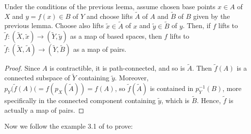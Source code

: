 \documentclass[TFM.tex]{subfiles}
\begin{document}
\begin{lemma}\label{lift}
Under the conditions of the previous leema, assume chosen base points $x\in A$ of $X$ and $y=f(x)\in B$ of $Y$ and choose lifts $\widetilde{A}$ of $A$ and $\widetilde{B}$ of $B$ given by the previous lemma. Choose also lifts $\widetilde{x}\in\widetilde{A}$ of $x$ and $\widetilde{y}\in\widetilde{B}$ of $y$. Then, if $f$ lifts to $\widetilde{f}:(\widetilde{X},\widetilde{x})\to (\widetilde{Y},\widetilde{y})$ as a map of based spaces, then $f$ lifts to $\widetilde{f}:(\widetilde{X},\widetilde{A})\to (\widetilde{Y},\widetilde{B})$ as a map of pairs. 
\end{lemma}
\begin{proof}
Since $A$ is contractible, it is path-connected, and so is $\widetilde{A}$. Then $\widetilde{f}(A)$ is a connected subspace of $\widetilde{Y}$ containing $\widetilde{y}$. Moreover, $p_Y(\widetilde{f}(A)(=f(p_X(\widetilde{A}))=f(A)$, so $\widetilde{f}(\widetilde{A})$ is contained in $p_Y^{-1}(B)$, more specifically in the connected component containing $\widetilde{y}$, which is $\widetilde{B}$. Hence, $\widetilde{f}$ is actually a map of pairs.
\end{proof}

Now we follow the example 3.1 of \cite{bar} to prove:
\end{document}

